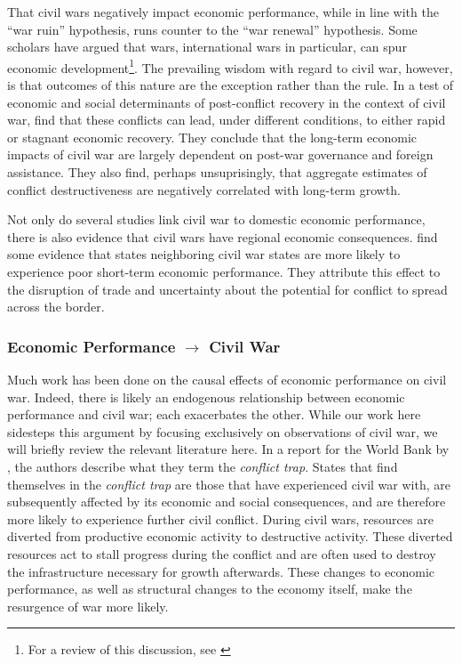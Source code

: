 That civil wars negatively impact economic performance, while in line with the ``war ruin'' hypothesis, runs counter to the ``war renewal'' hypothesis.  Some scholars have argued that wars, international wars in particular, can spur economic development\footnote{For a review of this discussion, see \cite{rasler:thompson:1985}}.  The prevailing wisdom with regard to civil war, however, is that outcomes of this nature are the exception rather than the rule.  In a test of economic and social determinants of post-conflict recovery in the context of civil war, \cite{kang:meernick:2005} find that these conflicts can lead, under different conditions, to either rapid or stagnant economic recovery.  They conclude that the long-term economic impacts of civil war are largely dependent on post-war governance and foreign assistance.  They also find, perhaps unsuprisingly, that aggregate estimates of conflict destructiveness are negatively correlated with long-term growth.

Not only do several studies link civil war to domestic economic performance, there is also evidence that civil wars have regional economic consequences.  \cite{murdoch:sandler:2002} find some evidence that states neighboring civil war states are more likely to experience poor short-term economic performance.  They attribute this effect to the disruption of trade and uncertainty about the potential for conflict to spread across the border.

\subsubsection{Economic Performance $\rightarrow$ Civil War}

Much work has been done on the causal effects of economic performance on civil war.  Indeed, there is likely an endogenous relationship between economic performance and civil war; each exacerbates the other.  While our work here sidesteps this argument by focusing exclusively on observations of civil war, we will briefly review the relevant literature here.  In a report for the World Bank by \cite{collier:etal:2003}, the authors describe what they term the \textit{conflict trap}.  States that find themselves in the \textit{conflict trap} are those that have experienced civil war with, are subsequently affected by its economic and social consequences, and are therefore more likely to experience further civil conflict.  During civil wars, resources are diverted from productive economic activity to destructive activity.  These diverted resources act to stall progress during the conflict and are often used to destroy the infrastructure necessary for growth afterwards.  These changes to economic performance, as well as structural changes to the economy itself, make the resurgence of war more likely.  

